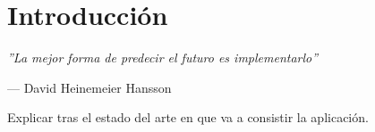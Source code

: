 \chapter{Introducción}

\epigraph{\textit{''La mejor forma de predecir el futuro es implementarlo''}}{--- David Heinemeier Hansson}

{\color{red} Explicar tras el estado del arte en que va a consistir la aplicación.}